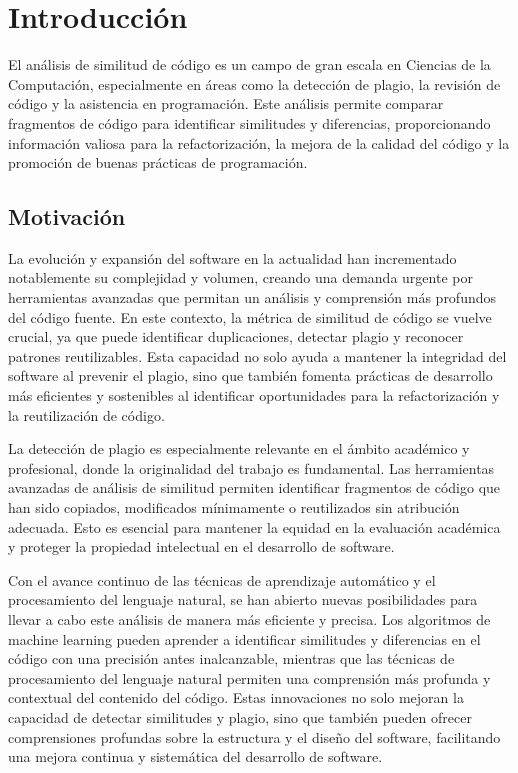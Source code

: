 \chapter*{Introducción}\label{chapter:introduction}

El análisis de similitud de código es un campo de gran escala en Ciencias de la Computación, especialmente en áreas como la detección de plagio, la revisión de código y la asistencia en programación. Este análisis permite comparar fragmentos de código para identificar similitudes y diferencias, proporcionando información valiosa para la refactorización, la mejora de la calidad del código y la promoción de buenas prácticas de programación. \\

\section*{Motivación}
La evolución y expansión del software en la actualidad han incrementado notablemente su complejidad y volumen, creando una demanda urgente por herramientas avanzadas que permitan un análisis y comprensión más profundos del código fuente. En este contexto, la métrica de similitud de código se vuelve crucial, ya que puede identificar duplicaciones, detectar plagio y reconocer patrones reutilizables. Esta capacidad no solo ayuda a mantener la integridad del software al prevenir el plagio, sino que también fomenta prácticas de desarrollo más eficientes y sostenibles al identificar oportunidades para la refactorización y la reutilización de código.

La detección de plagio es especialmente relevante en el ámbito académico y profesional, donde la originalidad del trabajo es fundamental. Las herramientas avanzadas de análisis de similitud permiten identificar fragmentos de código que han sido copiados, modificados mínimamente o reutilizados sin atribución adecuada. Esto es esencial para mantener la equidad en la evaluación académica y proteger la propiedad intelectual en el desarrollo de software.

Con el avance continuo de las técnicas de aprendizaje automático y el procesamiento del lenguaje natural, se han abierto nuevas posibilidades para llevar a cabo este análisis de manera más eficiente y precisa. Los algoritmos de machine learning pueden aprender a identificar similitudes y diferencias en el código con una precisión antes inalcanzable, mientras que las técnicas de procesamiento del lenguaje natural permiten una comprensión más profunda y contextual del contenido del código. Estas innovaciones no solo mejoran la capacidad de detectar similitudes y plagio, sino que también pueden ofrecer comprensiones profundas sobre la estructura y el diseño del software, facilitando una mejora continua y sistemática del desarrollo de software.

